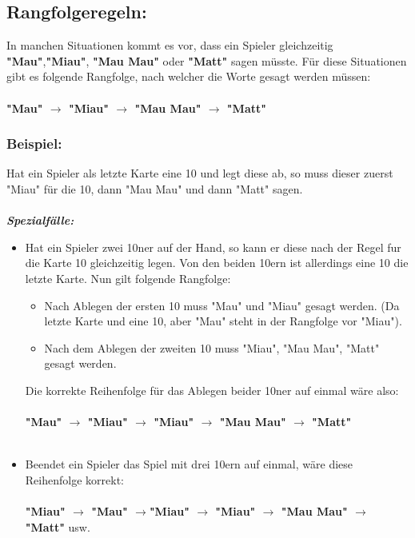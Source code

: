 \documentclass{article}
\begin{document}
\subsection*{Rangfolgeregeln:}

In manchen Situationen kommt es vor, dass ein Spieler gleichzeitig \textbf{"Mau"},\textbf{"Miau"}, \textbf{"Mau Mau"} oder \textbf{"Matt"} sagen müsste. Für diese Situationen gibt es folgende Rangfolge, nach welcher die Worte gesagt werden müssen: \\ \\ \textbf{"Mau" $\rightarrow$ "Miau" $\rightarrow$ "Mau Mau" $\rightarrow$ "Matt"}
          
\subsubsection*{Beispiel:}
Hat ein Spieler als letzte Karte eine 10 und legt diese ab, so muss dieser zuerst "Miau" für die 10, dann "Mau Mau" und dann "Matt" sagen. \\ \\
\textit{\textbf{Spezialfälle:}}
\begin{itemize}
\item Hat ein Spieler zwei 10ner auf der Hand, so kann er diese nach der Regel fur die Karte 10 gleichzeitig legen. Von den beiden 10ern ist allerdings eine 10 die letzte Karte. Nun gilt folgende Rangfolge: \\
\begin{itemize}
\item Nach Ablegen der ersten 10 muss "Mau" und "Miau" gesagt werden. (Da letzte Karte und eine 10, aber "Mau" steht in der Rangfolge vor "Miau").
\item Nach dem Ablegen der zweiten 10 muss "Miau", "Mau Mau", "Matt" gesagt werden.
\end{itemize}
Die korrekte Reihenfolge für das Ablegen beider 10ner auf einmal wäre also: \\ \\
\textbf{"Mau" $\rightarrow$ "Miau" $\rightarrow$ "Miau" $\rightarrow$ "Mau Mau" $\rightarrow$ "Matt"} \\ \\
        
\item Beendet ein Spieler das Spiel mit drei 10ern auf einmal, wäre diese Reihenfolge korrekt: \\ \\  
       \textbf{"Miau" $\rightarrow$ "Mau" $\rightarrow$"Miau" $\rightarrow$ "Miau" $\rightarrow$ "Mau Mau" $\rightarrow$ "Matt"} usw.
\end{itemize}
\end{document}
